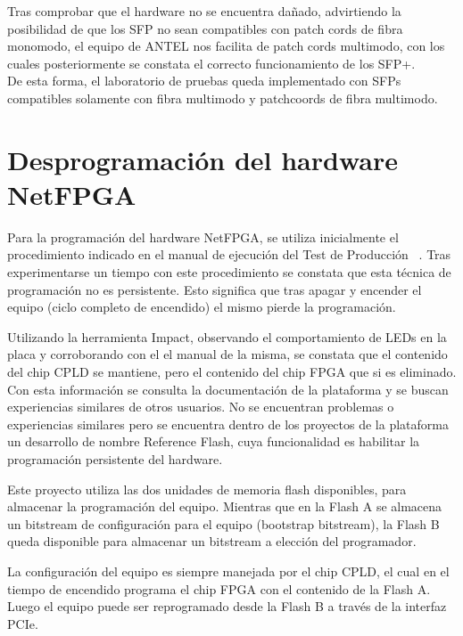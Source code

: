 Tras comprobar que el hardware no se encuentra dañado, advirtiendo la posibilidad de que los SFP no sean compatibles con patch cords de fibra monomodo, el equipo de ANTEL nos facilita de patch cords multimodo, con los cuales posteriormente se constata el correcto funcionamiento de los SFP+.\\

De esta forma, el laboratorio de pruebas queda implementado con SFPs compatibles solamente con fibra multimodo y patchcoords de fibra multimodo.

\section{Desprogramaci\'on del hardware NetFPGA}
\label{apendiceB2}

Para la programación del hardware NetFPGA, se utiliza inicialmente el procedimiento indicado en el manual de ejecuci\'on del Test de Producci\'on ~\citep{ProdTestManual}. Tras experimentarse un tiempo con este procedimiento se constata que esta técnica de programación no es persistente. Esto significa que tras apagar y encender el equipo (ciclo completo de encendido) el mismo pierde la programación. 

Utilizando la herramienta Impact, observando el comportamiento de LEDs en la placa y corroborando con el el manual de la misma, se constata que el contenido del chip CPLD se mantiene, pero el contenido del chip FPGA que si es eliminado.\\

Con esta información se consulta la documentación de la plataforma y se buscan experiencias similares  de otros usuarios. No se encuentran problemas o experiencias similares pero se encuentra dentro de los proyectos de la plataforma un desarrollo de nombre Reference Flash, cuya funcionalidad es habilitar la programación persistente del hardware.

Este proyecto utiliza las dos unidades de memoria flash disponibles, para almacenar la programaci\'on del equipo. Mientras que en la Flash A se almacena un bitstream de configuración para el equipo 
 (bootstrap bitstream), la  Flash B queda disponible para almacenar un bitstream a elección del programador. 

La configuración del equipo es siempre manejada por el chip CPLD, el cual en el tiempo de encendido programa el chip FPGA con el contenido de la Flash A. Luego el equipo puede ser reprogramado desde la Flash B a través de la interfaz PCIe.

